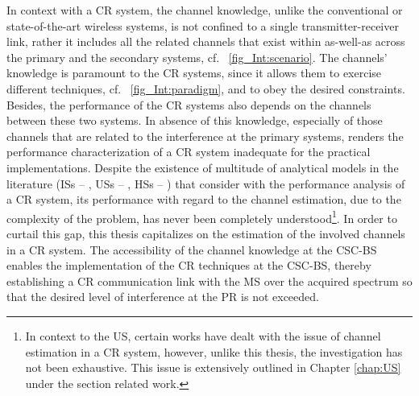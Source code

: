 In context with a CR system, the channel knowledge, unlike the conventional or state-of-the-art wireless systems, is not confined to a single transmitter-receiver link, rather it includes all the related channels that exist within as-well-as across the primary and the secondary systems, cf. \figurename~\ref{fig_Int:scenario}. The channels' knowledge is paramount to the CR systems, since it allows them to exercise different techniques, cf. \figurename~\ref{fig_Int:paradigm}, and to obey the desired constraints. Besides, the performance of the CR systems also depends on the channels between these two systems. In absence of this knowledge, especially of those channels that are related to the interference at the primary systems, renders the performance characterization of a CR system inadequate for the practical implementations. Despite the existence of multitude of analytical models in the literature (ISs -- \cite{Liang08, Sharma14, Pradhan15}, USs -- \cite{Xing07, Ghasemi07, Kang09}, HSs -- \cite{Song13, Gmira15, Jiang13, Fili15}) that consider with the performance analysis of a CR system, its performance with regard to the channel estimation, due to the complexity of the problem, has never been completely understood\footnote{In context to the US, certain works \cite{Musa09, Suraweera10, Kim12} have dealt with the issue of channel estimation in a CR system, however, unlike this thesis, the investigation has not been exhaustive. This issue is extensively outlined in Chapter \ref{chap:US} under the section related work.}. In order to curtail this gap, this thesis capitalizes on the estimation of the involved channels in a CR system. The accessibility of the channel knowledge at the CSC-BS enables the implementation of the CR techniques at the CSC-BS, thereby establishing a CR communication link with the MS over the acquired spectrum so that the desired level of interference at the PR is not exceeded. 

